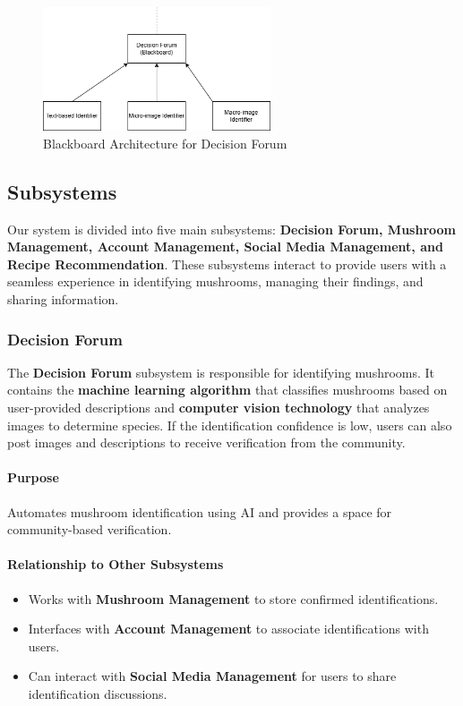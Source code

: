\documentclass[]{article}
\begin{document}
\begin{figure}[H]
	\centering
	\includegraphics[width=0.6\textwidth]{blackboard-df.png}
	\caption{Blackboard Architecture for Decision Forum}
	\label{fig:blackboard}
\end{figure}


\subsection{Subsystems}
Our system is divided into five main subsystems: \textbf{Decision Forum, Mushroom Management, Account Management, Social Media Management, and Recipe Recommendation}. These subsystems interact to provide users with a seamless experience in identifying mushrooms, managing their findings, and sharing information.

\subsubsection{Decision Forum}
The \textbf{Decision Forum} subsystem is responsible for identifying mushrooms. It contains the \textbf{machine learning algorithm} that classifies mushrooms based on user-provided descriptions and \textbf{computer vision technology} that analyzes images to determine species. If the identification confidence is low, users can also post images and descriptions to receive verification from the community.
 
\paragraph{Purpose}
Automates mushroom identification using AI and provides a space for community-based verification.
 
\paragraph{Relationship to Other Subsystems}
\begin{itemize}
    \item Works with \textbf{Mushroom Management} to store confirmed identifications.
    \item Interfaces with \textbf{Account Management} to associate identifications with users.
    \item Can interact with \textbf{Social Media Management} for users to share identification discussions.
\end{itemize}
 
\end{document}
